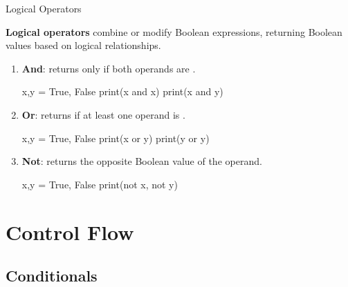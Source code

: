 \documentclass[10pt]{article}
\begin{document}
    \begin{core}{Logical Operators}

      \textbf{Logical operators} combine or modify Boolean expressions, returning Boolean values based on logical relationships.

      \begin{enumerate}

        \item \textbf{And}:  returns  only if both operands are .

        \begin{pyconsole}

          x,y = True, False
          print(x and x)
          print(x and y)

        \end{pyconsole}
        
        \item \textbf{Or}:  returns  if at least one operand is .

        \begin{pyconsole}

          x,y = True, False
          print(x or y)
          print(y or y)

        \end{pyconsole}
        
        \item \textbf{Not}:  returns the opposite Boolean value of the operand.

        \begin{pyconsole}

          x,y = True, False
          print(not x, not y)

        \end{pyconsole}

      \end{enumerate}

    \end{core}

\section{Control Flow}

  \subsection{Conditionals}
\end{document}
